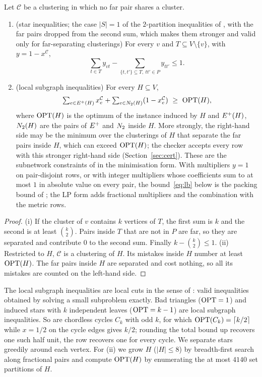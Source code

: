\begin{proposition}\label{prop:subgraph}
Let $\mathcal C$ be a clustering in which no far pair shares a cluster.
\begin{enumerate}
\item[(i)] (star inequalities; the case $|S|=1$ of the $2$-partition
inequalities of \citet{GrotschelW89,GrotschelW90facets}, with the far pairs dropped from the
second sum, which makes them stronger and valid only for far-separating
clusterings) For every $v$ and $T\subseteq V\setminus\{v\}$, with
$y=1-x^{\mathcal C}$,
\[\textstyle\sum_{t\in T}y_{vt}-\sum_{\{t,t'\}\subseteq T,\ tt'\in P}y_{tt'}\le 1.\]
\item[(ii)] (local subgraph inequalities) For every $H\subseteq V$,
\[\textstyle\sum_{e\in E^{+}(H)}x^{\mathcal C}_e+\sum_{e\in N_{2}(H)}(1-x^{\mathcal C}_e)\ \ge\ \mathrm{OPT}(H),\]
where $\mathrm{OPT}(H)$ is the optimum of the instance induced by $H$ and $E^{+}(H)$,
$N_{2}(H)$ are the pairs of $E^{+}$ and $N_{2}$ inside $H$.  More strongly, the
right-hand side may be the minimum over the clusterings of $H$ that separate
the far pairs inside $H$, which can exceed $\mathrm{OPT}(H)$; the checker accepts
every row with this stronger right-hand side (Section~\ref{sec:cert}).  These
are the subnetwork constraints of \citet{belyi2023subnetwork} in the
minimisation form.  With multipliers $y=1$ on pair-disjoint rows, or with
integer multipliers whose coefficients sum to at most $1$ in absolute value
on every pair, the bound~\eqref{eq:lb} below is the packing bound of
\citet[Theorem~1]{BlasiusEtAl22sea}; the LP form adds fractional
multipliers and the combination with the metric rows.
\end{enumerate}
\end{proposition}
\begin{proof}
(i) If the cluster of $v$ contains $k$ vertices of $T$, the first sum is $k$
and the second is at least $\binom k2$.  Pairs inside $T$ that are not in $P$
are far, so they are separated and contribute $0$ to the second sum.
Finally $k-\binom k2\le1$.  (ii) Restricted to $H$, $\mathcal C$ is a clustering
of $H$.  Its mistakes inside $H$ number at least $\mathrm{OPT}(H)$.  The far pairs
inside $H$ are separated and cost nothing, so all its mistakes are counted
on the left-hand side.
\end{proof}

The local subgraph inequalities are local cuts in the sense of
\citet{ApplegateBCC01localcuts}: valid inequalities obtained by solving a small
subproblem exactly.  Bad triangles ($\mathrm{OPT}=1$) and induced stars with $k$ independent leaves
($\mathrm{OPT}=k-1$) are local subgraph inequalities.  So are chordless cycles $C_k$
with odd $k$, for which $\mathrm{OPT}(C_k)=\lceil k/2\rceil$ while $x=1/2$ on the
cycle edges gives $k/2$; rounding the total bound up recovers one such half
unit, the row recovers one for every cycle.  We separate stars greedily around
each vertex.  For (ii) we grow $H$ ($|H|\le 8$) by breadth-first search along
fractional pairs and compute $\mathrm{OPT}(H)$ by enumerating the at most $4140$
set partitions of $H$.

